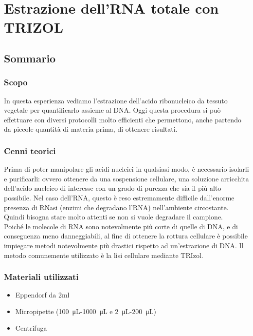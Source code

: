 \chapter{Estrazione dell’RNA totale con TRIZOL}

\vspace{0.6cm}


\section{Sommario}


\subsection{Scopo}
In questa esperienza vediamo l’estrazione dell’acido ribonucleico da tessuto
vegetale per quantificarlo assieme al DNA. Oggi questa procedura si pu\`o effettuare
con diversi protocolli molto efficienti che permettono, anche partendo da piccole quantit\`a
di materia prima, di ottenere risultati.

\subsection{Cenni teorici}
Prima di poter manipolare gli acidi nucleici in qualsiasi modo, è necessario
isolarli e purificarli: ovvero ottenere da una sospensione cellulare,
una soluzione arricchita dell’acido nucleico di interesse con un grado di purezza
che sia il più alto possibile. Nel caso dell’RNA, questo è reso estremamente
difficile dall’enorme presenza di RNasi (enzimi che degradano l’RNA) nell’ambiente circostante.
Quindi bisogna stare molto attenti se non si vuole degradare il campione. \\
Poiché le molecole di RNA sono notevolmente più corte di quelle di DNA, e di conseguenza
meno danneggiabili, al fine di ottenere la rottura cellulare è possibile
impiegare metodi notevolmente più drastici rispetto ad un’estrazione di DNA.
Il metodo comunemente utilizzato è la lisi cellulare mediante TRIzol.

\subsection{Materiali utilizzati}

\begin{itemize}
\item Eppendorf da 2ml
\item Micropipette (\SI{100}{\micro\liter}-\SI{1000}{\micro\liter} e \SI{2}{\micro\liter}-\SI{200}{\micro\liter})
\item Centrifuga
\end{itemize}

